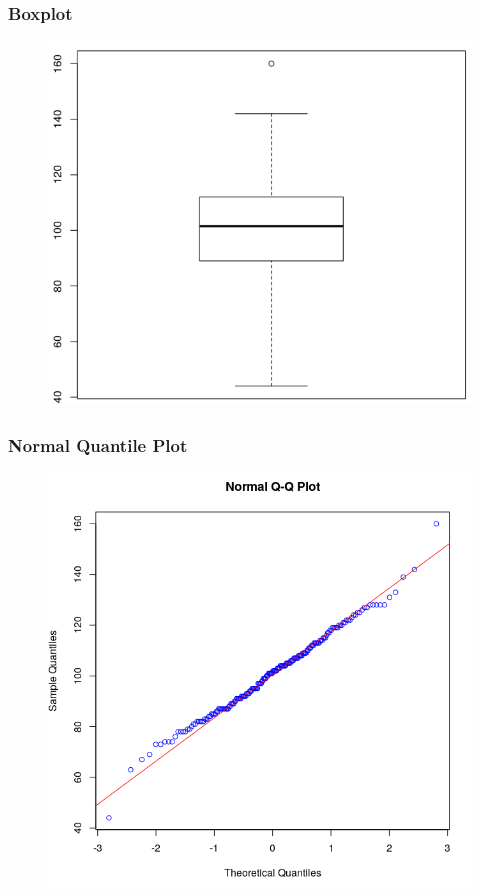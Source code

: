\documentclass[xcolor=dvipsnames]{beamer}
\begin{document}
\begin{frame}
  \frametitle{Boxplot}
\begin{figure}[h]
\includegraphics[scale=.4]{./diagrams/an-box.png}
\end{figure}
\end{frame}

\begin{frame}
  \frametitle{Normal Quantile Plot}
\begin{figure}[h]
\includegraphics[scale=.35]{./diagrams/an-nqp.png}
\end{figure}
\end{frame}
\end{document}

